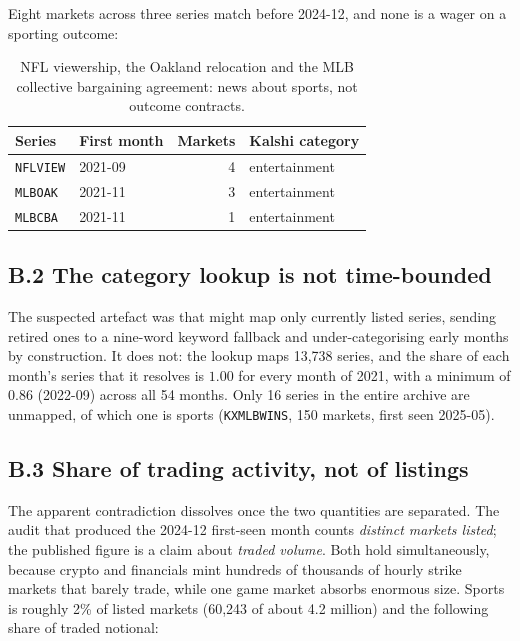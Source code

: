 \documentclass[11pt,a4paper]{article}
\begin{document}
Eight markets across three series match before 2024-12, and none is a wager on
a sporting outcome:

\begin{table}[ht]
\centering\small
\begin{tabular}{llrl}
\toprule
Series & First month & Markets & Kalshi category \\
\midrule
\texttt{NFLVIEW} & 2021-09 & 4 & entertainment \\
\texttt{MLBOAK} & 2021-11 & 3 & entertainment \\
\texttt{MLBCBA} & 2021-11 & 1 & entertainment \\
\bottomrule
\end{tabular}
\caption{NFL viewership, the Oakland relocation and the MLB collective
bargaining agreement: news about sports, not outcome contracts.}
\end{table}

\subsection*{B.2 The category lookup is not time-bounded}

The suspected artefact was that  might
map only currently listed series, sending retired ones to a nine-word keyword
fallback and under-categorising early months by construction. It does not: the
lookup maps 13,738 series, and the share of each month's series that it
resolves is $1.00$ for every month of 2021, with a minimum of $0.86$
(2022-09) across all 54 months. Only 16 series in the entire archive are
unmapped, of which one is sports (\texttt{KXMLBWINS}, 150 markets, first seen
2025-05).

\subsection*{B.3 Share of trading activity, not of listings}

The apparent contradiction dissolves once the two quantities are separated.
The audit that produced the 2024-12 first-seen month counts \emph{distinct
markets listed}; the published figure is a claim about \emph{traded volume}.
Both hold simultaneously, because crypto and financials mint hundreds of
thousands of hourly strike markets that barely trade, while one game market
absorbs enormous size. Sports is roughly 2\% of listed markets (60,243 of
about 4.2 million) and the following share of traded notional:
\end{document}
